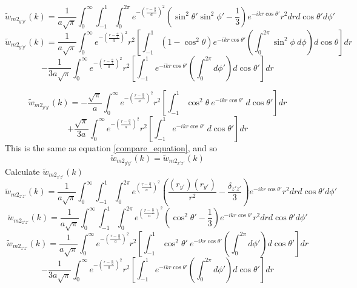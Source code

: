 \documentclass[double,12pt]{beavtex}
\begin{document}
\begin{equation}{\widetilde{w}_{{m2}_{y'y'}}(k)=\frac{1}{a\sqrt{\pi}}\int_{0}^{\infty}\int_{-1}^{1}\int_{0}^{2\pi}e^{-\left(\frac{r-\frac{\alpha}{2}}{a}\right)^2}\left(\sin^2\theta'\sin^2\phi'-\frac{1}{3}\right)e^{-ikr\cos\theta'}r^2d{r}d{\cos\theta'}d{\phi'}}\end{equation}
\[{}\]
\begin{displaymath}{\widetilde{w}_{{m2}_{y'y'}}(k)=\frac{1}{a\sqrt{\pi}}\int_{0}^{\infty}e^{-\left(\frac{r-\frac{\alpha}{2}}{a}\right)^2}r^2\left[\int_{-1}^{1}\left(1-\cos^2\theta\right)e^{-ikr\cos\theta'}\left(\int_{0}^{2\pi}\sin^2\phi~d{\phi}\right)d{\cos\theta}\right]d{r}}\end{displaymath} 
\begin{equation}{-\frac{1}{3a\sqrt{\pi}}\int_{0}^{\infty}e^{-\left(\frac{r-\frac{\alpha}{2}}{a}\right)^2}r^2\left[\int_{-1}^{1}e^{-ikr\cos\theta'}\left(\int_{0}^{2\pi}d{\phi'}\right)d{\cos\theta'}\right]d{r}}\end{equation}

\color{blue}
\begin{displaymath}{\widetilde{w}_{{m2}_{y'y'}}(k)=-\frac{\sqrt{\pi}}{a}\int_{0}^{\infty}e^{-\left(\frac{r-\frac{\alpha}{2}}{a}\right)^2}r^2\left[\int_{-1}^{1}\cos^2\theta~e^{-ikr\cos\theta'}~d{\cos\theta'}\right]d{r}}\end{displaymath} 
\begin{equation}{+\frac{\sqrt{\pi}}{3a}\int_{0}^{\infty}e^{-\left(\frac{r-\frac{\alpha}{2}}{a}\right)^2}r^2\left[\int_{-1}^{1}e^{-ikr\cos\theta'}~d{\cos\theta'}\right]d{r}}\end{equation}
\color{black} 
\[{}\]
This is the same as equation \ref{compare_equation}, and so \begin{equation}{\widetilde{w}_{{m2}_{y'y'}}(k)=\widetilde{w}_{{m2}_{x'x'}}(k)}\end{equation}
Calculate $\widetilde{w}_{{m2}_{z'z'}}(k)$ 
\begin{equation}{\widetilde{w}_{{m2}_{z'z'}}(k)=\frac{1}{a\sqrt{\pi}}\int_{0}^{\infty}\int_{-1}^{1}\int_{0}^{2\pi}e^{\left(\frac{r-\frac{\alpha}{2}}{a}\right)^2}\left(\frac{(r_{y'})(r_{y'})}{r^2}-\frac{\delta_{z'z'}}{3}\right)e^{-ikr\cos\theta'}r^2d{r}d{\cos\theta'}d{\phi'}}\end{equation}
\begin{equation}{\widetilde{w}_{{m2}_{z'z'}}(k)=\frac{1}{a\sqrt{\pi}}\int_{0}^{\infty}\int_{-1}^{1}\int_{0}^{2\pi}e^{\left(\frac{r-\frac{\alpha}{2}}{a}\right)^2}\left(\cos^2\theta'-\frac{1}{3}\right)e^{-ikr\cos\theta'}r^2d{r}d{\cos\theta'}d{\phi'}}\end{equation}
\[{}\]
\begin{displaymath}{\widetilde{w}_{{m2}_{z'z'}}(k)=\frac{1}{a\sqrt{\pi}}\int_{0}^{\infty}e^{-\left(\frac{r-\frac{\alpha}{2}}{a}\right)^2}r^2\left[\int_{-1}^{1}\cos^2\theta'~e^{-ikr\cos\theta'}\left(\int_{0}^{2\pi}d{\phi'}\right)d{\cos\theta'}\right]d{r}}\end{displaymath} 
\begin{equation}{-\frac{1}{3a\sqrt{\pi}}\int_{0}^{\infty}e^{-\left(\frac{r-\frac{\alpha}{2}}{a}\right)^2}r^2\left[\int_{-1}^{1}e^{-ikr\cos\theta'}\left(\int_{0}^{2\pi}d{\phi'}\right)d{\cos\theta'}\right]d{r}}\end{equation}
\end{document}
